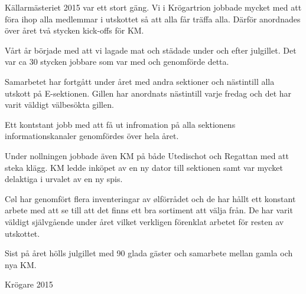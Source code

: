 \documentclass[../_main/handlingar.tex]{subfiles}
\begin{document}

Källarmästeriet 2015 var ett stort gäng. Vi i Krögartrion jobbade mycket med att föra ihop alla medlemmar i utskottet så att alla får träffa alla. Därför anordnades över året två stycken kick-offs för KM.

Vårt år började med att vi lagade mat och städade under och efter julgillet. Det var ca 30 stycken jobbare som var med och genomförde detta.

Samarbetet har fortgått under året med andra sektioner och nästintill alla utskott på E-sektionen. Gillen har anordnats nästintill varje fredag och det har varit väldigt välbesökta gillen.

Ett kontstant jobb med att få ut infromation på alla sektionens informationskanaler genomfördes över hela året.

Under nollningen jobbade även KM på både Utedischot och Regattan med att steka klägg. KM ledde inköpet av en ny dator till sektionen samt var mycket delaktiga i urvalet av en ny spis.

Cøl har genomfört flera inventeringar av ølförrådet och de har hållt ett konstant arbete med att se till att det finns ett bra sortiment att välja från. De har varit väldigt självgående under året vilket verkligen förenklat arbetet för resten av utskottet.

Sist på året hölls julgillet med 90 glada gäster och samarbete mellan gamla och nya KM.

\begin{signatures}{1}
    \mvh
    \signature{Emma Anzén}{Krögare 2015}
\end{signatures}
\end{document}
